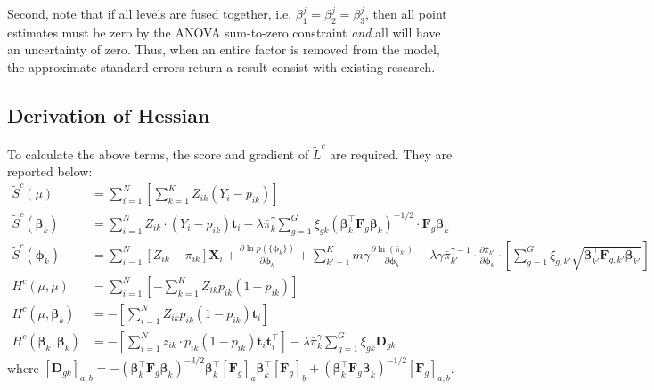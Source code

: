 Second, note that if all levels are fused together, i.e. $\beta^j_1 = \beta^j_2 = \beta^j_3$, then all point estimates must be zero by the ANOVA sum-to-zero constraint \emph{and} all will have an uncertainty of zero. Thus, when an entire factor is removed from the model, the approximate standard errors return a result consist with existing research.

\subsection{Derivation of Hessian}\label{append:hess}

To calculate the above terms, the score and gradient of $\tilde{L}^c$ are required. They are reported below: 
\begin{align*}
  \tilde{S}^c(\mu) &= \sum_{i=1}^N \left[\sum_{k=1}^K Z_{ik} (Y_i - p_{ik})\right] \\
  \tilde{S}^c(\bm{\beta}_k) &= \sum_{i=1}^N Z_{ik} \cdot (Y_i - p_{ik}) \bm{t}_i - \lambda \bar{\pi}^\gamma_k \sum_{g=1}^G \xi_{gk} (\bm{\beta}_k^\top\bm{F}_{g}\bm{\beta}_k)^{-1/2} \cdot \bm{F}_{g} \bm{\beta}_k \\
  \tilde{S}^c(\bm{\phi}_k) &= \sum_{i=1}^N \left[Z_{ik} - \pi_{ik}\right] \bm{X}_i + \frac{\partial \ln p(\{\bm{\phi}_k\})}{\partial \bm{\phi}_k} + \sum_{k'=1}^K m \gamma \frac{\partial
      \ln(\bar{\pi}_{k'})}{\partial \bm{\phi}_k} - \lambda \gamma
      \bar{\pi}_{k'}^{\gamma-1} \cdot \frac{\partial
      \bar{\pi}_{k'}}{\partial \bm{\phi}_k} \cdot \left[\sum_{g=1}^G
      \xi_{g,k'}
      \sqrt{\bm{\beta}_{k'}^\top\bm{F}_{g,k'}\bm{\beta}_{k'}}\right] \\
  H^c(\mu, \mu) & = \sum_{i=1}^N \left[-\sum_{k=1}^K Z_{ik} p_{ik} (1-p_{ik})\right]\\
  H^c(\mu, \bm{\beta}_k) & = -\left[\sum_{i=1}^N Z_{ik} p_{ik}
                           (1-p_{ik}) \bm{t}_i\right] \\
H^c(\bm{\beta}_k, \bm{\beta}_k) &=-\left[\sum_{i=1}^N z_{ik} \cdot
                                  p_{ik} (1-p_{ik})
                                  \bm{t}_i\bm{t}_i^\top\right] -
                                  \lambda \bar{\pi}^\gamma_k
                                  \sum_{g=1}^G \xi_{gk} \bm{D}_{gk}  
\end{align*}
where
$\left[\bm{D}_{gk}\right]_{a,b}
=-\left(\bm{\beta}_k^\top\bm{F}_{g}\bm{\beta}_k\right)^{-3/2}
\bm{\beta}_k^\top\left[\bm{F}_{g}\right]_a
\bm{\beta}_k^\top\left[\bm{F}_{g}\right]_b +
\left(\bm{\beta}_k^\top\bm{F}_{g}\bm{\beta}_k\right)^{-1/2}
\left[\bm{F}_{g}\right]_{a,b}$. \allowdisplaybreaks
